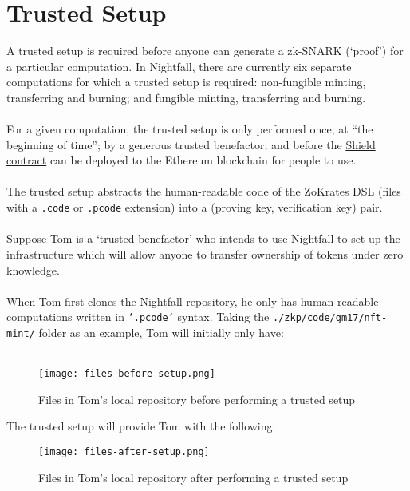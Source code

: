 \documentclass{article}
\begin{document}
\newpage
\section{Trusted Setup}
\label{sec:trustedSetup}

A trusted setup is required before anyone can generate a zk-SNARK (`proof') for a particular computation. In Nightfall, there are currently six separate computations for which a trusted setup is required: non-fungible minting, transferring and burning; and fungible minting, transferring and burning.\\
\\
For a given computation, the trusted setup is only performed once; at ``the beginning of time''; by a generous trusted benefactor; and before the \hyperref[sec:smartContracts]{Shield contract} can be deployed to the Ethereum blockchain for people to use.\\
\\
The trusted setup abstracts the human-readable code of the ZoKrates DSL (files with a \texttt{.code} or \texttt{.pcode} extension) into a (proving key, verification key) pair.\\
\\
Suppose Tom is a `trusted benefactor' who intends to use Nightfall to set up the infrastructure which will allow anyone to transfer ownership of tokens under zero knowledge.\\
\\
When Tom first clones the Nightfall repository, he only has human-readable computations written in \texttt{`.pcode'} syntax. Taking the \texttt{./zkp/code/gm17/nft-mint/} folder as an example, Tom will initially only have:\\
\\

\begin{figure}[H]
  \centering
  \texttt{[image: files-before-setup.png]}
  \caption{Files in Tom's local repository before performing a trusted setup}
  \label{pic:filesBeforeSetup}
\end{figure}

The trusted setup will provide Tom with the following:

\begin{figure}[H]
  \centering
  \texttt{[image: files-after-setup.png]}
  \caption{Files in Tom's local repository after performing a trusted setup}
  \label{pic:filesAfterSetup}
\end{figure}
\end{document}
